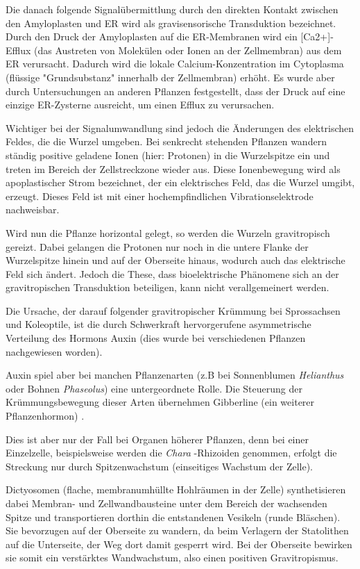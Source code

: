 \documentclass[
a4paper, 
11pt, 
ngerman,
listof=totoc,
bibliography=totocnumbered,
abstracton
]{scrreprt}
\begin{document}
Die danach folgende Signalübermittlung durch den direkten Kontakt zwischen den Amyloplasten und ER wird als gravisensorische Transduktion bezeichnet.
Durch den Druck der Amyloplasten auf die ER-Membranen wird ein [Ca2+]-Efflux (das Austreten von Molekülen oder Ionen an der Zellmembran) aus dem ER verursacht.
Dadurch wird die lokale Calcium-Konzentration im Cytoplasma (flüssige "Grundsubstanz" innerhalb der Zellmembran) erhöht. 
Es wurde aber durch Untersuchungen an anderen Pflanzen festgestellt, dass der Druck auf eine einzige ER-Zysterne ausreicht, um einen Efflux zu verursachen.

Wichtiger bei der Signalumwandlung sind jedoch die Änderungen des elektrischen Feldes, die die Wurzel umgeben.
Bei senkrecht stehenden Pflanzen wandern ständig positive geladene Ionen (hier: Protonen) in die Wurzelspitze ein und treten im Bereich der Zellstreckzone wieder aus.
Diese Ionenbewegung wird als apoplastischer Strom bezeichnet, der ein elektrisches Feld, das die Wurzel umgibt, erzeugt. Dieses Feld ist mit einer hochempfindlichen Vibrationselektrode nachweisbar. 

Wird nun die Pflanze horizontal gelegt, so werden die Wurzeln gravitropisch gereizt. Dabei gelangen die Protonen nur noch in die untere Flanke der Wurzelspitze hinein und auf der Oberseite hinaus, wodurch auch das elektrische Feld sich ändert.
Jedoch die These, dass bioelektrische Phänomene sich an der gravitropischen Transduktion beteiligen, kann nicht verallgemeinert werden.

Die Ursache, der darauf folgender gravitropischer Krümmung bei Sprossachsen und Koleoptile, ist die durch Schwerkraft hervorgerufene asymmetrische Verteilung des Hormons Auxin (dies wurde bei verschiedenen Pflanzen nachgewiesen worden).

Auxin spiel aber bei manchen Pflanzenarten (z.B bei Sonnenblumen \emph{Helianthus}  oder Bohnen \emph{Phaseolus}) eine untergeordnete Rolle.
Die Steuerung der Krümmungsbewegung dieser Arten übernehmen Gibberline (ein weiterer Pflanzenhormon) \parencite[502f]{Nultsch}.
  
Dies ist aber nur der Fall bei Organen höherer Pflanzen, denn bei einer Einzelzelle, beispielsweise werden die \emph{Chara} -Rhizoiden genommen, erfolgt die Streckung nur durch Spitzenwachstum (einseitiges Wachstum der Zelle).

Dictyosomen (flache, membranumhüllte Hohlräumen in der Zelle) synthetisieren dabei Membran- und Zellwandbausteine unter dem Bereich der wachsenden Spitze und transportieren dorthin die entstandenen Vesikeln (runde Bläschen).
Sie bevorzugen auf der Oberseite zu wandern, da beim Verlagern der Statolithen auf die Unterseite, der Weg dort damit gesperrt wird. Bei der Oberseite bewirken sie somit ein verstärktes Wandwachstum, also einen positiven Gravitropismus.
\end{document}
